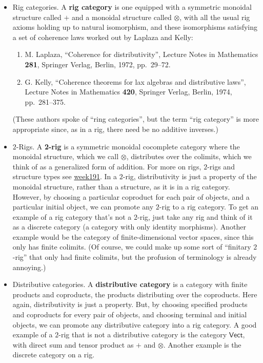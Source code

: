 \documentclass{article}
\begin{document}
\begin{itemize}
\item
  Rig categories. A \textbf{rig category} is one equipped with a
  symmetric monoidal structure called \(+\) and a monoidal structure
  called \(\otimes\), with all the usual rig axioms holding up to
  natural isomorphism, and these isomorphisms satisfying a set of
  coherence laws worked out by Laplaza and Kelly:

  \begin{enumerate}
  \def\labelenumi{\arabic{enumi})}
  \setcounter{enumi}{16}
  \item
    M. Laplaza, ``Coherence for distributivity'', Lecture Notes in
    Mathematics \textbf{281}, Springer Verlag, Berlin, 1972, pp.~29--72.
  \item
    G. Kelly, ``Coherence theorems for lax algebras and distributive
    laws'', Lecture Notes in Mathematics \textbf{420}, Springer Verlag,
    Berlin, 1974, pp.~281--375.
  \end{enumerate}

  (These authors spoke of ``ring categories'', but the term ``rig
  category'' is more appropriate since, as in a rig, there need be no
  additive inverses.)
\item
  \(2\)-Rigs. A \textbf{2-rig} is a symmetric monoidal cocomplete
  category where the monoidal structure, which we call \(\otimes\),
  distributes over the colimits, which we think of as a generalized form
  of addition. For more on rigs, \(2\)-rigs and structure types see
  \href{week191.html}{week191}. In a \(2\)-rig, distributivity is just a
  property of the monoidal structure, rather than a structure, as it is
  in a rig category. However, by choosing a particular coproduct for
  each pair of objects, and a particular initial object, we can promote
  any \(2\)-rig to a rig category. To get an example of a rig category
  that's not a \(2\)-rig, just take any rig and think of it as a
  discrete category (a category with only identity morphisms). Another
  example would be the category of finite-dimensional vector spaces,
  since this only has finite colimits. (Of course, we could make up some
  sort of ``finitary \(2\)-rig'' that only had finite colimits, but the
  profusion of terminology is already annoying.)
\item
  Distributive categories. A \textbf{distributive category} is a
  category with finite products and coproducts, the products
  distributing over the coproducts. Here again, distributivity is just a
  property. But, by choosing specified products and coproducts for every
  pair of objects, and choosing terminal and initial objects, we can
  promote any distributive category into a rig category. A good example
  of a \(2\)-rig that is not a distributive category is the category
  \(\mathsf{Vect}\), with direct sum and tensor product as \(+\) and
  \(\otimes\). Another example is the discrete category on a rig.
\end{itemize}
\end{document}
